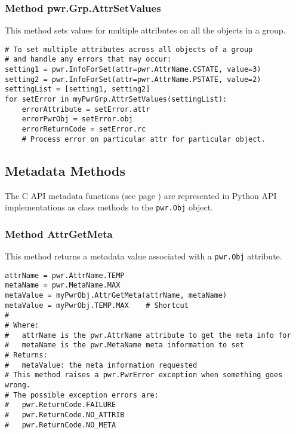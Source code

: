 \subsubsection{Method pwr.Grp.AttrSetValues}
\label{meth:GrpAttrSetValues}

This method sets values for multiple attributes on all the objects in a
group.

\begin{center}\begin{minipage}{.95\linewidth}\begin{lstlisting}
# To set multiple attributes across all objects of a group
# and handle any errors that may occur:
setting1 = pwr.InfoForSet(attr=pwr.AttrName.CSTATE, value=3)
setting2 = pwr.InfoForSet(attr=pwr.AttrName.PSTATE, value=2)
settingList = [setting1, setting2]
for setError in myPwrGrp.AttrSetValues(settingList):
    errorAttribute = setError.attr
    errorPwrObj = setError.obj
    errorReturnCode = setError.rc
    # Process error on particular attr for particular object.
\end{lstlisting}\end{minipage}\end{center}

\subsection{Metadata Methods} \label{sec:PythonMetadataMethods}
The C API metadata functions (see page \pageref{sec:METADATA}) are represented
in Python API implementations as class methods to the \texttt{pwr.Obj}
object.

\subsubsection{Method AttrGetMeta} \label{meth:AttrGetMeta}

This method returns a metadata value associated with a \texttt{pwr.Obj} attribute.
\begin{center}\begin{minipage}{.95\linewidth}\begin{lstlisting}
attrName = pwr.AttrName.TEMP
metaName = pwr.MetaName.MAX
metaValue = myPwrObj.AttrGetMeta(attrName, metaName)
metaValue = myPwrObj.TEMP.MAX    # Shortcut
#
# Where:
#   attrName is the pwr.AttrName attribute to get the meta info for
#   metaName is the pwr.MetaName meta information to set
# Returns:
#   metaValue: the meta information requested
# This method raises a pwr.PwrError exception when something goes wrong.
# The possible exception errors are:
#   pwr.ReturnCode.FAILURE
#   pwr.ReturnCode.NO_ATTRIB
#   pwr.ReturnCode.NO_META
\end{lstlisting}\end{minipage}\end{center}


